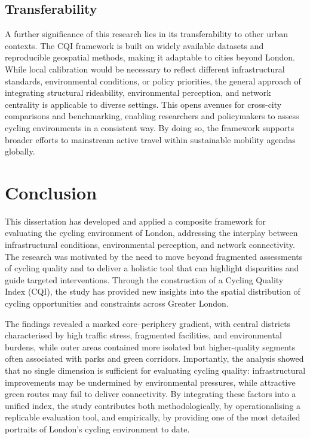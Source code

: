 \documentclass[
  12pt,
  oneside]{book}
\begin{document}
\section{Transferability}\label{transferability}

A further significance of this research lies in its transferability to other urban contexts. The CQI framework is built on widely available datasets and reproducible geospatial methods, making it adaptable to cities beyond London. While local calibration would be necessary to reflect different infrastructural standards, environmental conditions, or policy priorities, the general approach of integrating structural rideability, environmental perception, and network centrality is applicable to diverse settings. This opens avenues for cross-city comparisons and benchmarking, enabling researchers and policymakers to assess cycling environments in a consistent way. By doing so, the framework supports broader efforts to mainstream active travel within sustainable mobility agendas globally.

\chapter{Conclusion}\label{conclusion-1}

This dissertation has developed and applied a composite framework for evaluating the cycling environment of London, addressing the interplay between infrastructural conditions, environmental perception, and network connectivity. The research was motivated by the need to move beyond fragmented assessments of cycling quality and to deliver a holistic tool that can highlight disparities and guide targeted interventions. Through the construction of a Cycling Quality Index (CQI), the study has provided new insights into the spatial distribution of cycling opportunities and constraints across Greater London.

The findings revealed a marked core--periphery gradient, with central districts characterised by high traffic stress, fragmented facilities, and environmental burdens, while outer areas contained more isolated but higher-quality segments often associated with parks and green corridors. Importantly, the analysis showed that no single dimension is sufficient for evaluating cycling quality: infrastructural improvements may be undermined by environmental pressures, while attractive green routes may fail to deliver connectivity. By integrating these factors into a unified index, the study contributes both methodologically, by operationalising a replicable evaluation tool, and empirically, by providing one of the most detailed portraits of London's cycling environment to date.
\end{document}

